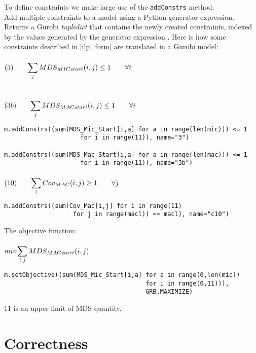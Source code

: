 To define constraints we make large use of the \texttt{addConstrs} method:
\\
Add multiple constraints to a model using a Python generator expression. Returns a Gurobi \textit{tupledict} that contains the newly created constraints, indexed by the values generated by the generator expression \cite{gurobi}.
\clearpage
Here is how some constraints described in \ref{ilp_form} are translated in a Gurobi model: \\\\

\noindent $(3) \qquad \mathlarger{\sum_{j} MDS_{MICstart}(i,j)\leq 1 \qquad \forall i}$  \\\\\\
$(3b) \qquad \mathlarger{\sum_{j} MDS_{MACstart}(i,j)\leq 1 \qquad \forall i}$

\begin{verbatim}
m.addConstrs((sum(MDS_Mic_Start[i,a] for a in range(len(mic))) <= 1
                     for i in range(11)), name="3")

m.addConstrs((sum(MDS_Mac_Start[i,a] for a in range(len(mac))) <= 1
                     for i in range(11)), name="3b")
\end{verbatim}
\paragraph{}
\noindent $(10) \qquad \mathlarger{\sum_{i} Cov_{MAC}(i,j) \geq 1 \qquad \forall j }$ 
\begin{verbatim}
m.addConstrs((sum(Cov_Mac[i,j] for i in range(11)
                   for j in range(macl)) == macl), name="c10")
\end{verbatim}

The objective function: \\\\

\noindent $min \mathlarger{\sum_{i,j} MDS_{MACstart}(i,j)}$

\begin{verbatim}
m.setObjective((sum(MDS_Mic_Start[i,a] for a in range(0,len(mic))
                                       for i in range(0,11))),
                                       GRB.MAXIMIZE)
\end{verbatim}

11 is an upper limit of MDS quantity.

\clearpage
\section{Correctness}
\label{correctness}

